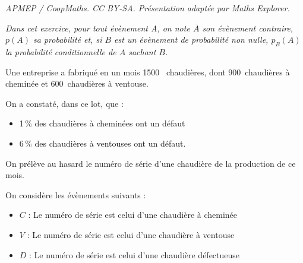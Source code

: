 \documentclass[10pt]{article}
\providecommand{\np}[2][]{{#2~#1}}
\begin{document}
\noindent\textit{APMEP / CoopMaths. CC BY-SA. Présentation adaptée par Maths Explorer.}\par\medskip
\medskip

\emph{Dans cet exercice, pour tout évènement A, on note $\overline{A}$ son évènement contraire, $p(A)$ sa probabilité et, si $B$ est un évènement de probabilité non nulle, $p_B(A)$ la probabilité conditionnelle de $A$ sachant $B$.}

\medskip

Une entreprise a fabriqué en un mois \np{1500} chaudières, dont $900$~chaudières à
cheminée et $600$~chaudières à ventouse.

On a constaté, dans ce lot, que :

\begin{itemize}
\item 1\,\% des chaudières à cheminées ont un défaut
\item 6\,\% des chaudières à ventouses ont un défaut.
\end{itemize}

On prélève au hasard le numéro de série d'une chaudière de la production de ce
mois.

On considère les évènements suivants :

\begin{itemize}
\item $C$ : \og Le numéro de série est celui d'une chaudière à cheminée \fg
\item $V$ : \og Le numéro de série est celui d'une chaudière à ventouse \fg
\item $D$ : \og Le numéro de série est celui d'une chaudière défectueuse \fg
\end{itemize}

\medskip
\end{document}
